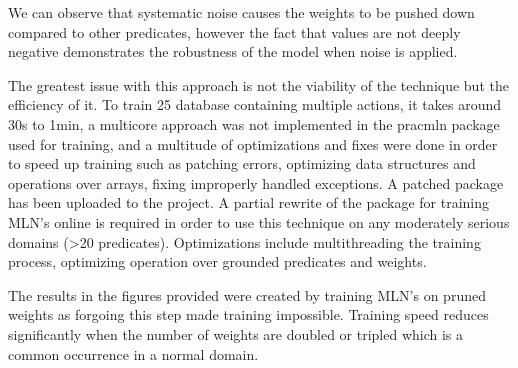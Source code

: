 We can observe that systematic noise causes the weights to be pushed down compared to other predicates, however the fact that values are not deeply negative demonstrates the robustness of the model when noise is applied.

The greatest issue with this approach is not the viability of the technique but the efficiency of it.
To train 25 database containing multiple actions, it takes around 30s to 1min, a multicore approach was not implemented in the pracmln package used for training, and a multitude of optimizations and fixes were done in order to speed up training such as patching errors, optimizing data structures and operations over arrays, fixing improperly handled exceptions.
A patched package has been uploaded to the project.
A partial rewrite of the package for training MLN's online is required in order to use this technique on any moderately serious domains (>20 predicates).
Optimizations include multithreading the training process, optimizing operation over grounded predicates and weights.

The results in the figures provided were created by training MLN's on pruned weights as forgoing this step made training impossible.
Training speed reduces significantly when the number of weights are doubled or tripled which is a common occurrence in a normal domain.